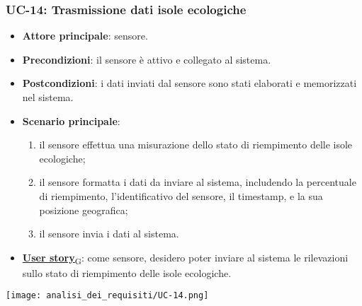 \subsubsection{UC-14: Trasmissione dati isole ecologiche}
\begin{itemize}
	\item \textbf{Attore principale}: sensore.
	\item \textbf{Precondizioni}: il sensore è attivo e collegato al sistema.
	\item \textbf{Postcondizioni}: i dati inviati dal sensore sono stati elaborati e memorizzati nel sistema.
	\item \textbf{Scenario principale}:
	      \begin{enumerate}
		      \item il sensore effettua una misurazione dello stato di riempimento delle isole ecologiche;
		      \item il sensore formatta i dati da inviare al sistema, includendo la percentuale di riempimento, l'identificativo del sensore,
		            il timestamp, e la sua posizione geografica;
		      \item il sensore invia i dati al sistema.
	      \end{enumerate}
	\item \href{https://7last.github.io/docs/pb/documentazione-interna/glossario\#user-story}{\textbf{User story}\textsubscript{G}}: come sensore, desidero poter inviare al sistema le rilevazioni sullo stato di riempimento delle isole ecologiche.
\end{itemize}

\begin{center}
	\texttt{[image: analisi\_dei\_requisiti/UC-14.png]}
\end{center}


